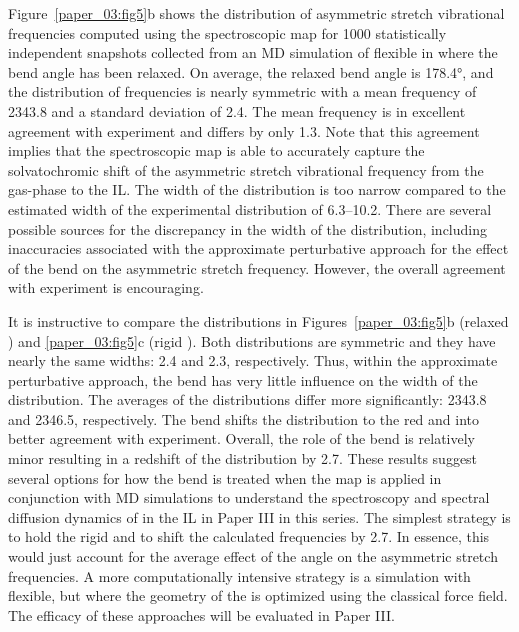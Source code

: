 \documentclass[]{article}
\begin{document}
Figure~\ref{paper_03:fig5}b shows the distribution of  asymmetric stretch vibrational frequencies computed using the spectroscopic map for \num{1000} statistically independent snapshots collected from an MD simulation of flexible  in \ce{[C4C1im][PF6]} where the  bend angle has been relaxed. On average, the relaxed bend angle is \ang{178.4}, and the distribution of frequencies is nearly symmetric with a mean frequency of \SI{2343.8}{\wavenumber} and a standard deviation of \SI{2.4}{\wavenumber}. The mean frequency is in excellent agreement with experiment and differs by only \SI{1.3}{\wavenumber}. Note that this agreement implies that the spectroscopic map is able to accurately capture the solvatochromic shift of the  asymmetric stretch vibrational frequency from the gas-phase to the \ce{[C4C1im][PF6]} IL. The width of the distribution is too narrow compared to the estimated width of the experimental distribution of \SIrange{6.3}{10.2}{\wavenumber}. There are several possible sources for the discrepancy in the width of the distribution, including inaccuracies associated with the approximate perturbative approach for the effect of the bend on the asymmetric stretch frequency. However, the overall agreement with experiment is encouraging.

It is instructive to compare the distributions in Figures~\ref{paper_03:fig5}b (relaxed ) and \ref{paper_03:fig5}c (rigid ). Both distributions are symmetric and they have nearly the same widths: \SI{2.4}{\wavenumber} and \SI{2.3}{\wavenumber}, respectively. Thus, within the approximate perturbative approach, the bend has very little influence on the width of the distribution. The averages of the distributions differ more significantly: \SI{2343.8}{\wavenumber} and \SI{2346.5}{\wavenumber}, respectively. The bend shifts the distribution to the red and into better agreement with experiment. Overall, the role of the bend is relatively minor resulting in a redshift of the distribution by \SI{2.7}{\wavenumber}. These results suggest several options for how the bend is treated when the map is applied in conjunction with MD simulations to understand the spectroscopy and spectral diffusion dynamics of  in the \ce{[C4C1im][PF6]} IL in Paper III in this series. The simplest strategy is to hold the  rigid and to shift the calculated frequencies by \SI{2.7}{\wavenumber}. In essence, this would just account for the average effect of the  angle on the asymmetric stretch frequencies. A more computationally intensive strategy is a simulation with  flexible, but where the geometry of the  is optimized using the classical force field. The efficacy of these approaches will be evaluated in Paper III.
\end{document}
